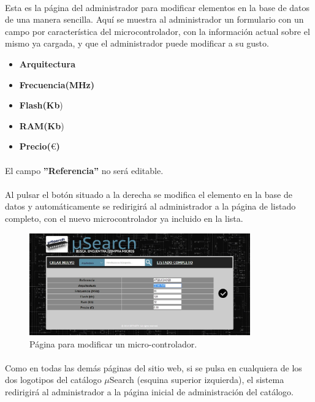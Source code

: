 \paragraph{} Esta es la página del administrador para modificar elementos en la base de datos de una manera sencilla. Aquí se muestra al administrador un formulario con un campo por característica del microcontrolador, con la información actual sobre el mismo ya cargada, y que el administrador puede modificar a su gusto.
\begin{itemize}
\item \textbf{Arquitectura}
\item \textbf{Frecuencia(MHz)}
\item \textbf{Flash(Kb})
\item \textbf{RAM(Kb}) 
\item \textbf{Precio($\euro$)}
\end{itemize}

\paragraph{} El campo \textbf{''Referencia''} no será editable.

\paragraph{} Al pulsar el botón situado a la derecha se modifica el elemento en la base de datos y automáticamente se redirigirá al administrador a la página de listado completo, con el nuevo microcontrolador ya incluido en la lista.

\begin{figure}[h!]
	\centering
	\includegraphics[width=0.85\textwidth]{img/editar}
	\caption{Página para modificar un micro-controlador.}
	\label{fig:editar}
\end{figure}

\paragraph{}Como en todas las demás páginas del sitio web, si se pulsa en cualquiera de los dos logotipos del catálogo $\mu$Search (esquina superior izquierda), el sistema redirigirá al administrador a la página inicial de administración del catálogo.

